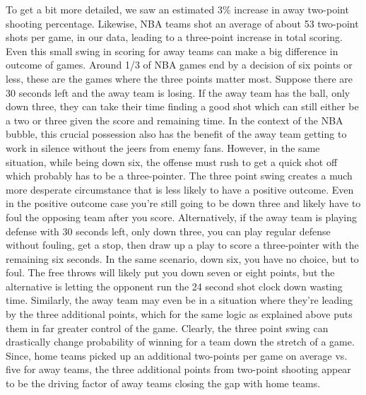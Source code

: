 \documentclass[10pt]{article}
\begin{document}
To get a bit more detailed, we saw an estimated 3\% increase in away two-point
shooting percentage. Likewise, NBA teams shot
an average of about 53 two-point shots per game, in our data, leading to a three-point increase in total scoring. Even this
small swing in scoring for away teams can make a big difference in outcome of
games. Around 1/3 of NBA games end by a decision of six points or less, these
are the games where the three points matter most. Suppose there are 30 seconds
left and the away team is losing. If the away team has the ball, only down three, they can take their time finding a good shot which can
still either be a two or three given the score and remaining time. In the context 
of the NBA bubble, this crucial possession also has the benefit of the away team
getting to work in silence without the jeers from enemy fans. However, in the
same situation, while being down six, the offense must rush to get a quick shot
off which probably has to be a three-pointer. The three point swing creates a much more desperate
circumstance that is less likely to have a positive outcome. Even in the positive
outcome case you're still going to be down three and likely have to foul the
opposing team after you score. 
Alternatively, if the away team is playing defense with 30 seconds left, only down 
three, you can play regular defense without fouling, get a stop, then draw up a play
to score a three-pointer with the remaining six seconds. In the same scenario, down 
six, you have no choice, but to foul. The free throws will likely put you down seven
or eight points, but the alternative is letting the opponent run the 24 second shot 
clock down wasting time. Similarly, the away team may even be in a situation where 
they're leading by the three additional points, which for the same logic as explained
above puts them in far greater control of the game. Clearly, the three point swing 
can drastically change probability of winning for a team down the stretch of a game. 
Since, home teams picked up an additional two-points per game on average vs. five for 
away teams, the three additional points from two-point shooting appear to be the driving
factor of away teams closing the gap with home teams.
\end{document}
